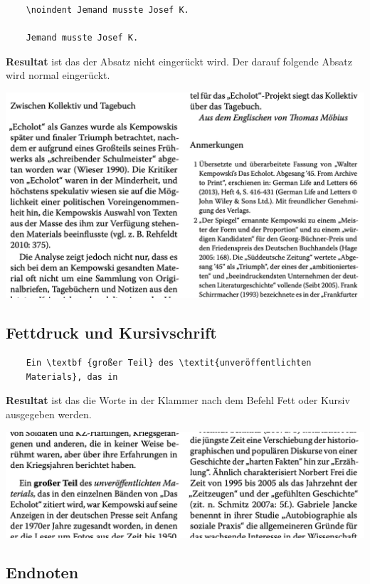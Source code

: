 \documentclass{article}
\begin{document}
\begin{lstlisting}
    \noindent Jemand musste Josef K. 

    Jemand musste Josef K. 
\end{lstlisting}

\textbf{Resultat} ist das der Absatz nicht eingerückt wird. Der darauf folgende Absatz wird normal eingerückt.

\begin{center}
    \includegraphics[scale=0.4]{noindent.png}
\end{center}

\subsection{Fettdruck und Kursivschrift}

\begin{lstlisting}
    Ein \textbf {großer Teil} des \textit{unveröffentlichten 
    Materials}, das in 
\end{lstlisting}

\textbf{Resultat} ist das die Worte in der Klammer nach dem Befehl Fett oder Kursiv ausgegeben werden.

\begin{center}
    \includegraphics[scale=0.4]{fett-kursiv.png}
\end{center}

\subsection{Endnoten}
\end{document}
